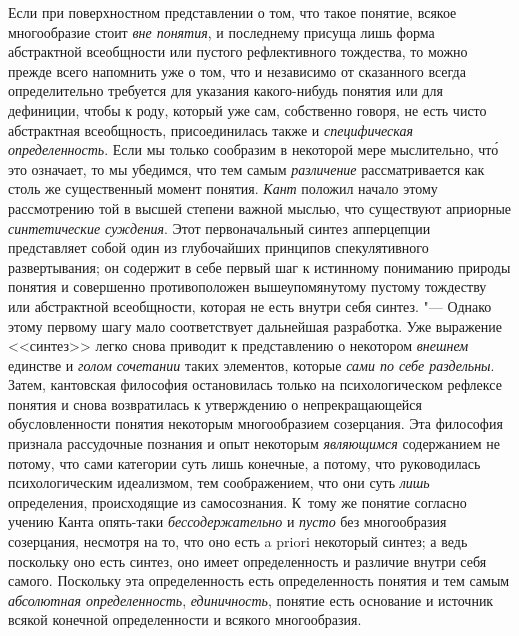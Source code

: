 Если при поверхностном представлении о том, что такое понятие,
всякое многообразие стоит {\em вне
понятия}, и последнему присуща лишь форма абстрактной
всеобщности или пустого рефлективного тождества, то можно прежде всего
напомнить уже о том, что и независимо от сказанного всегда определительно
требуется для указания какого-нибудь понятия или для
дефиниции, чтобы к роду, который уже сам, собственно говоря, не есть чисто
абстрактная всеобщность, присоединилась также и
{\em специфическая определенность}.
Если мы только сообразим в некоторой мере мыслительно, чт\'{о}
это означает, то мы убедимся, что тем самым
{\em различение}
рассматривается как столь же существенный момент понятия.
{\em Кант} положил начало
этому рассмотрению той в высшей степени важной мыслью, что существуют
априорные {\em синтетические суждения}.
Этот первоначальный синтез апперцепции представляет собой
один из глубочайших принципов спекулятивного развертывания; он содержит в
себе первый шаг к истинному пониманию природы понятия и совершенно
противоположен вышеупомянутому пустому тождеству или абстрактной
всеобщности, которая не есть внутри себя синтез. "--- Однако
этому первому шагу мало соответствует дальнейшая разработка. Уже выражение
<<синтез>> легко снова приводит к представлению о некотором
{\em внешнем} единстве и {\em голом сочетании} таких элементов, которые
{\em сами по себе раздельны}.
Затем, кантовская философия остановилась только на
психологическом рефлексе понятия и снова возвратилась к утверждению о
непрекращающейся обусловленности понятия некоторым многообразием
созерцания. Эта философия признала рассудочные познания и опыт некоторым
{\em являющимся}
содержанием не потому, что сами категории суть лишь конечные,
а потому, что руководилась психологическим идеализмом, тем соображением,
что они суть {\em лишь}
определения, происходящие из самосознания. К~тому же понятие
согласно учению Канта опять-таки
{\em бессодержательно} и
{\em пусто} без
многообразия созерцания, несмотря на то, что оно есть a priori
некоторый синтез; а ведь поскольку оно есть синтез, оно имеет
определенность и различие внутри себя самого. Поскольку эта определенность
есть определенность понятия и тем самым
{\em абсолютная определенность},
{\em единичность}, понятие
есть основание и источник всякой конечной определенности и всякого
многообразия.

